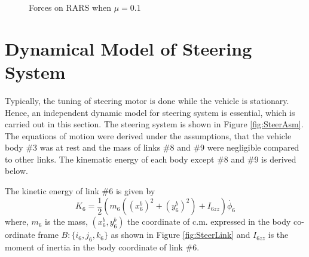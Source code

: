 {\begin{figure}
\begin{minipage}[t]{0.5\textwidth}
		\caption{Forces on RARS when $\mu=0.1$ }\label{fig:ForcesMu1}
	\end{minipage}
\end{figure}
\section{Dynamical Model of Steering System}
Typically, the tuning of steering motor is done while the vehicle is stationary. Hence, an independent dynamic model for steering system is essential, which is carried out in this section. 
The  steering system is shown in Figure \ref{fig:SteerAsm}. The equations of motion were derived under the assumptions,  that the vehicle body \#3 was at rest and  the mass of links \#8 and \#9 were negligible compared to other links. The kinematic energy of each body except \#8 and \#9 is derived below.

The kinetic energy of link  \#6 is given by
\begin{equation}
 K_6=\frac{1}{2}(m_6((x^b_6)^2+(y^b_6)^2)+I_{6zz})\dot{\phi_6}
\end{equation}
 where, $m_6$ is the mass, $(x^b_6,y^b_6)$  the coordinate of c.m.  expressed  in the body co-ordinate frame $B:\{i_6,j_6,k_6\}$ as shown in Figure \ref{fig:SteerLink} and $I_{6zz}$ is the moment of inertia in the body coordinate of link \#6.
 
}
